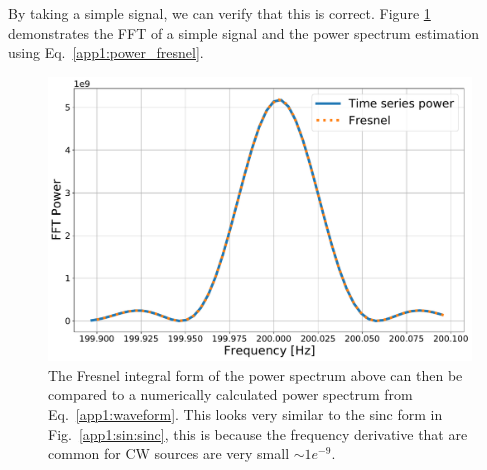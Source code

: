 By taking a simple signal, we can verify that this is correct. Figure \ref{app1:sinderivative:fresnel} demonstrates the \gls{FFT} of a simple signal and the power spectrum estimation using Eq.~\ref{app1:power_fresnel}.

\begin{figure}[ht]
	\centering
	\includegraphics[width=0.9\linewidth]{AppendixA/fresnel_fft.pdf}
	\caption[Comparison of power spectrum simulation with \gls{FFT} of sinusoid with frequency derivative.]{The Fresnel integral form of the power spectrum above can then be compared to a numerically calculated power spectrum from Eq.~\ref{app1:waveform}. This looks very similar to the sinc form in Fig.~\ref{app1:sin:sinc}, this is because the frequency derivative that are common for \gls{CW} sources are very small $\sim 1e^{-9} $. }
	\label{app1:sinderivative:fresnel}
\end{figure}

